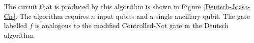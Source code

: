 The circuit that is produced by this algorithm is shown in Figure \ref{Deutsch-Jozsa-Cir}.
The algorithm requires $n$ input qubits and a single ancillary qubit.
The gate labelled $f$ is analogous to the modified Controlled-Not gate in the Deutsch algorithm.

% 
% 
% 
% 
